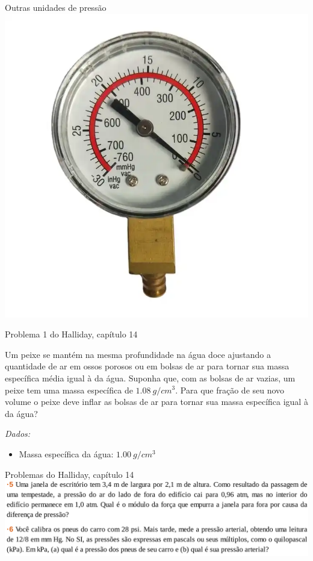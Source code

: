 \documentclass[t,%
brazilian,%
11pt,%
aspectratio=169,%
table%
]{beamer}
\begin{document}
\begin{frame}{Outras unidades de pressão}
    \includegraphics[height=\textheight-106pt]{images/mmHg.png}
\end{frame}

\begin{frame}{Problema 1 do Halliday, capítulo 14}
    \begin{minipage}{\textwidth}
        Um peixe se mantém na mesma profundidade na água doce ajustando a quantidade
        de ar em ossos porosos ou em bolsas de ar para tornar sua massa específica média
        igual à da água. Suponha que, com as bolsas de ar vazias, um peixe tem uma massa
        específica de \(\SI{1,08}{g/cm^3}\). Para que fração de seu novo volume o peixe deve inflar
        as bolsas de ar para tornar sua massa específica igual à da água?
    \end{minipage}

    \vspace{1cm}
    \textit{Dados:}
    \begin{itemize}
        \item Massa específica da água: \(\SI{1,00}{g/cm^3}\)
    \end{itemize}
\end{frame}

\begin{frame}{Problemas do Halliday, capítulo 14}
    \includegraphics[width=\textwidth]{images/Captura de tela de 2024-01-11 14-52-09.png}
\end{frame}
\end{document}
